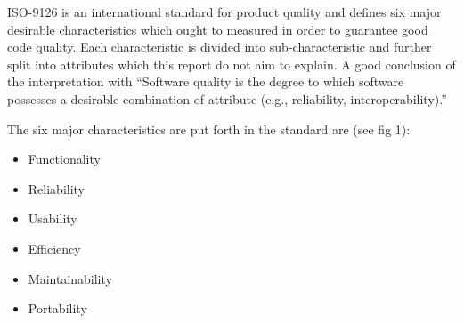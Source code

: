 ISO-9126 is an international standard for product quality and defines six major desirable characteristics which ought to measured in order to guarantee good code quality. Each characteristic is divided into sub-characteristic and further split into attributes which this report do not aim to explain. A good conclusion of the interpretation with 
“Software quality is the degree to which software possesses a desirable combination of attribute (e.g., reliability, interoperability).”~\cite{ISO1061}

The six major characteristics are put forth in the standard are (see fig 1): 
\begin{itemize}
\item Functionality 
\item Reliability
\item Usability
\item Efficiency
\item Maintainability
\item Portability
\end{itemize}